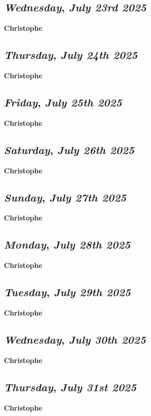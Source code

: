 \def\day{\textit{July 23rd 2025}}
\def\weekday{\textit{Wednesday}}
\subsection*{\weekday, \day}
\textbf {Christophe}

\def\day{\textit{July 24th 2025}}
\def\weekday{\textit{Thursday}}
\subsection*{\weekday, \day}
\textbf {Christophe}

\def\day{\textit{July 25th 2025}}
\def\weekday{\textit{Friday}}
\subsection*{\weekday, \day}
\textbf {Christophe}

\def\day{\textit{July 26th 2025}}
\def\weekday{\textit{Saturday}}
\subsection*{\weekday, \day}
\textbf {Christophe}

\def\day{\textit{July 27th 2025}}
\def\weekday{\textit{Sunday}}
\subsection*{\weekday, \day}
\textbf {Christophe}

\def\day{\textit{July 28th 2025}}
\def\weekday{\textit{Monday}}
\subsection*{\weekday, \day}
\textbf {Christophe}

\def\day{\textit{July 29th 2025}}
\def\weekday{\textit{Tuesday}}
\subsection*{\weekday, \day}
\textbf {Christophe}

\def\day{\textit{July 30th 2025}}
\def\weekday{\textit{Wednesday}}
\subsection*{\weekday, \day}
\textbf {Christophe}

\def\day{\textit{July 31st 2025}}
\def\weekday{\textit{Thursday}}
\subsection*{\weekday, \day}
\textbf {Christophe}
